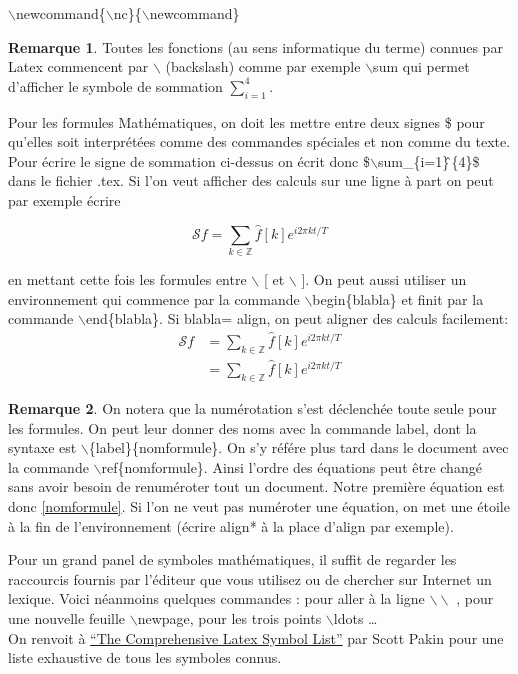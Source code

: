 \documentclass[11pt]{article}
\theoremstyle{remark}
\theoremstyle{definition}
\newtheorem{rem}{Remarque}[section]
\begin{document}
$\backslash$newcommand\{$\backslash$nc\}\{$\backslash$newcommand\}

\begin{rem}
 Toutes les fonctions (au sens informatique du terme) connues par Latex commencent par $\backslash$ (backslash) comme par exemple $\backslash$sum qui permet d'afficher le symbole de sommation $\sum_{i=1}^{4}$.
\end{rem}


Pour les formules Mathématiques, on doit  les mettre entre deux signes \$ pour qu'elles soit interprétées comme des commandes spéciales et non comme du texte. Pour écrire le signe de sommation ci-dessus on écrit donc \$$\backslash$sum\_\{i=1\}\^ \,\{4\}\$ dans le fichier .tex. Si l'on veut afficher des calculs sur une ligne à part on peut par exemple écrire

\[\mathcal{S}f = \sum_{k\in\mathbb{Z}} \hat f[k] e^{i2\pi kt/T} \]

en mettant cette fois les formules  entre  $\backslash$ [ et $\backslash$ ]. On peut aussi utiliser un environnement qui commence par la commande $\backslash$begin\{blabla\} et finit par la commande $\backslash$end\{blabla\}. Si blabla= align, on peut aligner des calculs facilement:
\begin{align}
 \mathcal{S}f & = \sum_{k\in\mathbb{Z}} \hat f[k] e^{i2\pi kt/T} \label{nomformule}\\
  & = \sum_{k\in\mathbb{Z}} \hat f[k] e^{i2\pi kt/T}
\end{align}

\begin{rem}
On notera que la numérotation s'est déclenchée toute seule pour les formules. On peut  leur donner des noms avec la commande label,  dont la syntaxe est  $\backslash$\{label\}\{nomformule\}.  On s'y référe plus tard dans le document  avec la commande $\backslash$ref\{nomformule\}. Ainsi l'ordre des équations peut être changé sans avoir besoin de renuméroter tout un document. Notre première équation est donc \ref{nomformule}. Si l'on ne veut pas numéroter une équation,  on met une étoile à la fin de l'environnement (écrire align* à la place d'align par exemple).
\end{rem}



Pour un grand panel de symboles mathématiques, il suffit de regarder les raccourcis fournis par l'éditeur que vous utilisez ou de chercher sur Internet un lexique. Voici néanmoins quelques commandes : pour aller à la ligne  $\backslash\backslash$ , pour une nouvelle feuille $\backslash$newpage, pour les trois points  $\backslash$ldots \ldots \medskip
\\
On renvoit à \href{http://www.ctan.org/get/info/symbols/comprehensive/symbols-a4.pdf}{``The Comprehensive Latex Symbol List''} par Scott Pakin pour une liste exhaustive de tous les symboles connus.
\end{document}
